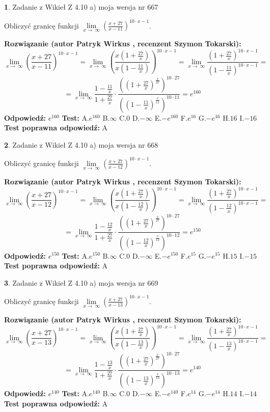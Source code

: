 \documentclass[12pt, a4paper]{article}
\theoremstyle{definition} %
\newtheorem{zad}{}
\newcommand{\zadStart}[1]{\begin{zad}#1\newline}
\newcommand{\zadStop}{\end{zad}}
\newcommand{\rozwStart}[2]{\noindent \textbf{Rozwiązanie (autor #1 , recenzent #2): }\newline}
\newcommand{\rozwStop}{\newline}
\newcommand{\odpStart}{\noindent \textbf{Odpowiedź:}\newline}
\newcommand{\odpStop}{\newline}
\newcommand{\testStart}{\noindent \textbf{Test:}\newline}
\newcommand{\testStop}{\newline}
\newcommand{\kluczStart}{\noindent \textbf{Test poprawna odpowiedź:}\newline}
\newcommand{\kluczStop}{\newline}
\begin{document}
\zadStart{Zadanie z Wikieł Z 4.10 a) moja wersja nr 667}

Obliczyć granicę funkcji  $\lim\limits_{x\to\ \infty}(\frac{x+27}{x-11})^{10\cdot x-1}$.
\zadStop
\rozwStart{Patryk Wirkus}{Szymon Tokarski}
$$\lim\limits_{x\to\ \infty}(\frac{x+27}{x-11})^{10\cdot x-1} = \lim\limits_{x\to\ \infty}(\frac{x(1+\frac{27}{x})}{x(1-\frac{11}{x})})^{10\cdot x-1}=\lim\limits_{x\to\ \infty}\frac{(1+\frac{27}{x})^{10\cdot x-1}}{(1-\frac{11}{x})^{10\cdot x-1}}=$$
$$=\lim\limits_{x\to\ \infty}\frac{1-\frac{11}{x}}{1+\frac{27}{x}}\cdot\frac{((1+\frac{27}{x})^{\frac{x}{27}})^{10\cdot27}}{((1-\frac{11}{x})^{\frac{x}{11}})^{10\cdot11}}=e^{160}$$
\rozwStop
\odpStart
$e^{160}$
\odpStop
\testStart
A.$e^{160}$ B.$\infty$ C.$0$ D.$-\infty$ E.$-e^{160}$
F.$e^{16}$ G.$-e^{16}$
H.$16$
I.$-16$
\testStop
\kluczStart
A
\kluczStop



\zadStart{Zadanie z Wikieł Z 4.10 a) moja wersja nr 668}

Obliczyć granicę funkcji  $\lim\limits_{x\to\ \infty}(\frac{x+27}{x-12})^{10\cdot x-1}$.
\zadStop
\rozwStart{Patryk Wirkus}{Szymon Tokarski}
$$\lim\limits_{x\to\ \infty}(\frac{x+27}{x-12})^{10\cdot x-1} = \lim\limits_{x\to\ \infty}(\frac{x(1+\frac{27}{x})}{x(1-\frac{12}{x})})^{10\cdot x-1}=\lim\limits_{x\to\ \infty}\frac{(1+\frac{27}{x})^{10\cdot x-1}}{(1-\frac{12}{x})^{10\cdot x-1}}=$$
$$=\lim\limits_{x\to\ \infty}\frac{1-\frac{12}{x}}{1+\frac{27}{x}}\cdot\frac{((1+\frac{27}{x})^{\frac{x}{27}})^{10\cdot27}}{((1-\frac{12}{x})^{\frac{x}{12}})^{10\cdot12}}=e^{150}$$
\rozwStop
\odpStart
$e^{150}$
\odpStop
\testStart
A.$e^{150}$ B.$\infty$ C.$0$ D.$-\infty$ E.$-e^{150}$
F.$e^{15}$ G.$-e^{15}$
H.$15$
I.$-15$
\testStop
\kluczStart
A
\kluczStop



\zadStart{Zadanie z Wikieł Z 4.10 a) moja wersja nr 669}

Obliczyć granicę funkcji  $\lim\limits_{x\to\ \infty}(\frac{x+27}{x-13})^{10\cdot x-1}$.
\zadStop
\rozwStart{Patryk Wirkus}{Szymon Tokarski}
$$\lim\limits_{x\to\ \infty}(\frac{x+27}{x-13})^{10\cdot x-1} = \lim\limits_{x\to\ \infty}(\frac{x(1+\frac{27}{x})}{x(1-\frac{13}{x})})^{10\cdot x-1}=\lim\limits_{x\to\ \infty}\frac{(1+\frac{27}{x})^{10\cdot x-1}}{(1-\frac{13}{x})^{10\cdot x-1}}=$$
$$=\lim\limits_{x\to\ \infty}\frac{1-\frac{13}{x}}{1+\frac{27}{x}}\cdot\frac{((1+\frac{27}{x})^{\frac{x}{27}})^{10\cdot27}}{((1-\frac{13}{x})^{\frac{x}{13}})^{10\cdot13}}=e^{140}$$
\rozwStop
\odpStart
$e^{140}$
\odpStop
\testStart
A.$e^{140}$ B.$\infty$ C.$0$ D.$-\infty$ E.$-e^{140}$
F.$e^{14}$ G.$-e^{14}$
H.$14$
I.$-14$
\testStop
\kluczStart
A
\kluczStop
\end{document}
